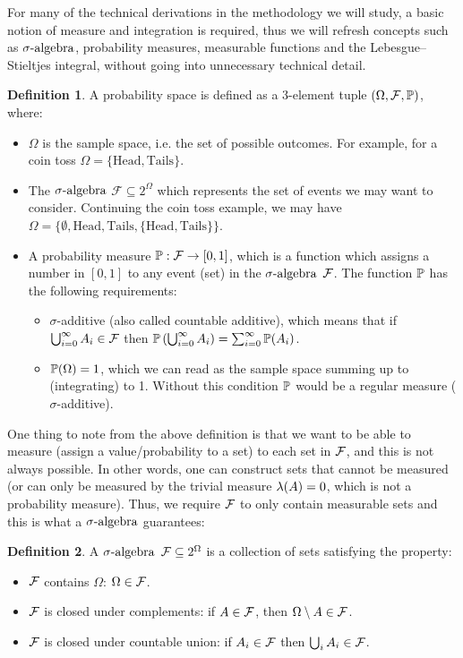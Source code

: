 \documentclass[a4paper,12pt,twoside,openright]{report}
\theoremstyle{definition}
\newtheorem{definition}{Definition}[section]
\begin{document}
For many of the technical derivations in the methodology we will study, a basic notion of measure and integration is required, thus we will refresh concepts such as $\sigalg$, probability measures,  measurable functions and the Lebesgue–Stieltjes integral, without going into unnecessary technical detail.

\begin{definition} \label{def:prob_space}
A probability space is defined as a 3-element tuple $\probspace$, where:
\begin{itemize}
    \item $\Omega$ is the sample space, i.e. the set of possible outcomes. For example, for a coin toss $\Omega=\{\text{Head}, \text{Tails}\}$. 
    \item The $\sigalg$ $\mathcal{F} \subseteq 2^{\Omega}$ which represents the set of events we may want to consider. Continuing the coin toss example, we may have $\Omega=\{\emptyset, \text{Head}, \text{Tails},\{\text{Head}, \text{Tails}\}\}$.
    \item A probability measure $\P:\calF \rightarrow [0,1]$, which is a function which assigns a number in $[0,1]$ to any event (set) in the $\sigalg$ $\calF$. The function $\P$ has the following requirements:
    \begin{itemize}
        \item $\sigma$-additive (also called countable additive), which means that if  $\bigcup_{i=0}^\infty  A_i\in \calF$ then $\P\left(\bigcup_{i=0}^\infty A_i\right) =\sum_{i=0}^\infty \P(A_i) $.
        \item $\P(\Omega)=1$, which we can read as the sample space summing up to (integrating) to 1.  Without this condition $\P$ would be a regular measure ($\sigma$-additive).
    \end{itemize}
\end{itemize}
\end{definition}
One thing to note from the above definition is that we want to be able to measure (assign a value/probability to a set) to each set in $\calF$, and this is not always possible. In other words, one can construct sets that cannot be measured (or can only be measured by the trivial measure $\callambda(A) = 0$, which is not a probability measure). Thus, we require $\calF$ to only contain measurable sets and this is what a $\sigalg$ guarantees:
\begin{definition}\label{def:sigma_algebra}
A $\sigalg$ $\calF \subseteq 2^{\Omega}$ is a collection of sets satisfying the property:
\begin{itemize}
    \item $\calF$ contains $\Omega$: $\Omega \in \calF$.
    \item $\calF$ is closed under complements: if $A\in\calF$, then $\Omega \setminus A \in \calF$.
    \item $\calF$ is closed under countable union:  if $A_i \in \calF$ then $\bigcup_i A_i \in \calF$.
\end{itemize}
\end{definition}
\end{document}
